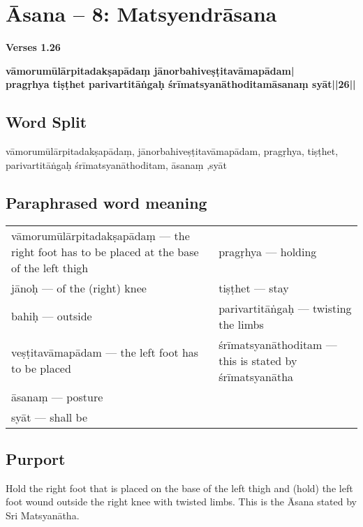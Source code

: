 \section*{Āsana -- 8: Matsyendrāsana}

\noindent \textbf{Verses 1.26}

\begin{shloka}
\textbf{vāmorumūlārpitadakṣapādaṃ jānorbahiveṣṭitavāmapādam|}\\
\textbf{pragṛhya tiṣṭhet parivartitāṅgaḥ śrīmatsyanāthoditamāsanaṃ syāt||26||}
\end{shloka}
\vspace{-10pt}

\subsection*{Word Split}

vāmorumūlārpitadakṣapādaṃ,  jānorbahiveṣṭitavāmapādam, pragṛhya,  tiṣṭhet, parivartitāṅgaḥ śrīmatsyanāthoditam, āsanaṃ ,syāt

\subsection*{Paraphrased word meaning}
\vspace{-10pt}

\begin{longtable}{>{\noindent\raggedright}p{5cm}>{\noindent\raggedright}p{5cm}}
vāmorumūlārpitadakṣapādaṃ --- the right
foot has to be placed at the base of the  
left thigh  & pragṛhya --- holding \tabularnewline
jānoḥ --- of the (right) knee & tiṣṭhet --- stay\tabularnewline
bahiḥ --- outside  & parivartitāṅgaḥ --- twisting the limbs\tabularnewline
veṣṭitavāmapādam --- the left foot has to be placed  & śrīmatsyanāthoditam --- this is stated by śrīmatsyanātha\tabularnewline
āsanaṃ --- posture & \tabularnewline
syāt --- shall be & 
\end{longtable}
\vspace{-10pt}

\subsection*{Purport}
\vspace{-10pt}

Hold the right foot that is placed on the base of the left thigh and (hold) the left foot wound outside the right knee with twisted limbs. This is the Āsana stated by Sri Matsyanātha.
\vspace{-10pt}

